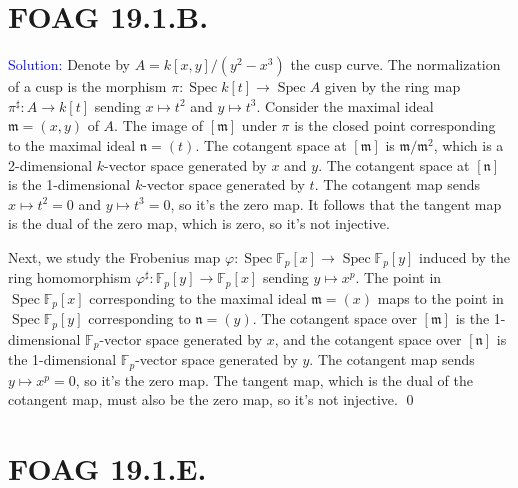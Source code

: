 \documentclass[11pt]{article}
\newcommand{\FF}{\mathbb{F}}
\newcommand{\km}{\mathfrak{m}}
\newcommand{\kn}{\mathfrak{n}}
\DeclareMathOperator{\Spec}{\operatorname{Spec}}
\newenvironment{solution}{\begin{trivlist}\item[]{\textcolor{blue}{Solution:}}}{\qed \end{trivlist}}
\begin{document}
\newpage

\section*{FOAG 19.1.B.}

\begin{solution}
    Denote by $A = k[x,y]/(y^2-x^3)$ the cusp curve. 
    The normalization of a cusp is the morphism $\pi: \Spec k[t] \rightarrow \Spec A$ given by the ring map $\pi^{\sharp}: A \rightarrow k[t]$ sending $x \mapsto t^2$ and $y \mapsto t^3$. Consider the maximal ideal $\km = (x, y)$ of $A$. The image of $[\km]$ under $\pi$ is the closed point corresponding to the maximal ideal $\kn = (t)$. The cotangent space at $[\km]$ is $\km / \km^2$, which is a 2-dimensional $k$-vector space generated by $x$ and $y$. The cotangent space at $[\kn]$ is the 1-dimensional $k$-vector space generated by $t$. The cotangent map sends $x \mapsto t^2 = 0$ and $y \mapsto t^3 = 0$, so it's the zero map. It follows that the tangent map is the dual of the zero map, which is zero, so it's not injective. 

    Next, we study the Frobenius map $\varphi: \Spec \FF_p[x] \rightarrow \Spec \FF_p[y]$ induced by the ring homomorphism $\varphi^{\sharp}: \FF_p[y] \rightarrow \FF_p[x]$ sending $y \mapsto x^p$. The point in $\Spec \FF_p[x]$ corresponding to the maximal ideal $\km = (x)$ maps to the point in $\Spec \FF_p[y]$ corresponding to $\kn = (y)$. The cotangent space over $[\km]$ is the 1-dimensional $\FF_p$-vector space generated by $x$, and the cotangent space over $[\kn]$ is the 1-dimensional $\FF_p$-vector space generated by $y$. The cotangent map sends $y \mapsto x^p = 0$, so it's the zero map. The tangent map, which is the dual of the cotangent map, must also be the zero map, so it's not injective. 
\end{solution}

\newpage

\section*{FOAG 19.1.E.}
\end{document}
